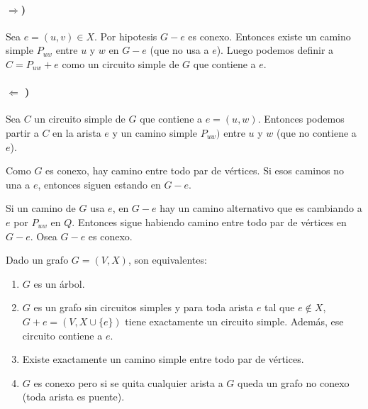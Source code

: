 \begin{demo} 
	\paragraph{\(\Rightarrow\))} Sea \(e =(u,v)\in X\). Por hipotesis \(G-e\) es conexo. Entonces existe un camino simple \(P_{uw}\) entre \(u\) y \(w\) en \(G - e\) (que no usa a \(e\)). Luego podemos definir a \(C = P_{uw} + e\) como un circuito simple de \(G\) que contiene a \(e\).
	
	\paragraph{\(\Leftarrow\) )} Sea \(C\) un circuito simple de \(G\) que contiene a \(e = (u,w)\). Entonces podemos partir a \(C\) en la arista \(e\) y un camino simple \(P_{uw})\) entre \(u\) y \(w\) (que no contiene a \(e\)).

	Como \(G\) es conexo, hay camino entre todo par de vértices. Si esos caminos no una a \(e\), entonces siguen estando en \(G-e\).
	
	Si un camino de \(G\) usa \(e\), en \(G-e\) hay un camino alternativo que es cambiando a \(e\) por \(P_{uw}\) en \(Q\). Entonces sigue habiendo camino entre todo par de vértices en \(G-e\). Osea \(G-e\) es conexo.
\end{demo}
\begin{theorem}
	Dado un grafo \(G=(V,X)\), son equivalentes:
	\begin{enumerate}
		\item \(G\) es un árbol.
		\item \(G\) es un grafo sin circuitos simples y para toda arista \(e\) tal que \(e\notin X\), \(G+e = (V, X\cup\{e\})\) tiene exactamente un circuito simple. Además, ese circuito contiene a \(e\).
		\item Existe exactamente un camino simple entre todo par de vértices.
		\item \(G\) es conexo pero si se quita cualquier arista a \(G\) queda un grafo no conexo (toda arista es puente).
	\end{enumerate}
\end{theorem}

